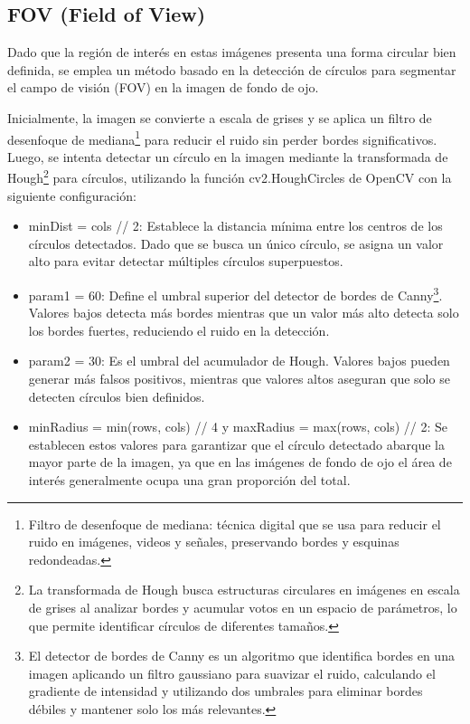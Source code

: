 \subsection{FOV (Field of View)}
Dado que la región de interés en estas imágenes presenta una forma circular bien definida, se emplea un método basado en la detección de círculos para segmentar el campo de visión (FOV) en la imagen de fondo de ojo.

Inicialmente, la imagen se convierte a escala de grises y se aplica un filtro de desenfoque de mediana\footnote{Filtro de desenfoque de mediana: técnica digital que se usa para reducir el ruido en imágenes, videos y señales, preservando bordes y esquinas redondeadas.} para reducir el ruido sin perder bordes significativos. Luego, se intenta detectar un círculo en la imagen mediante la transformada de Hough\footnote{La transformada de Hough busca estructuras circulares en imágenes en escala de grises al analizar bordes y acumular votos en un espacio de parámetros, lo que permite identificar círculos de diferentes tamaños.} para círculos, utilizando la función cv2.HoughCircles de OpenCV con la siguiente configuración:

\begin{itemize}
	\item minDist = cols // 2: Establece la distancia mínima entre los centros de los círculos detectados. Dado que se busca un único círculo, se asigna un valor alto para evitar detectar múltiples círculos superpuestos.
	\item param1 = 60: Define el umbral superior del detector de bordes de Canny\footnote{El detector de bordes de Canny es un algoritmo que identifica bordes en una imagen aplicando un filtro gaussiano para suavizar el ruido, calculando el gradiente de intensidad y utilizando dos umbrales para eliminar bordes débiles y mantener solo los más relevantes.}. Valores bajos detecta más bordes mientras que un valor más alto detecta solo los bordes fuertes, reduciendo el ruido en la detección.
	\item{param2 = 30: Es el umbral del acumulador de Hough. Valores bajos pueden generar más falsos positivos, mientras que valores altos aseguran que solo se detecten círculos bien definidos.}
	\item{minRadius = min(rows, cols) // 4 y maxRadius = max(rows, cols) // 2: Se establecen estos valores para garantizar que el círculo detectado abarque la mayor parte de la imagen, ya que en las imágenes de fondo de ojo el área de interés generalmente ocupa una gran proporción del total.}
\end{itemize}

